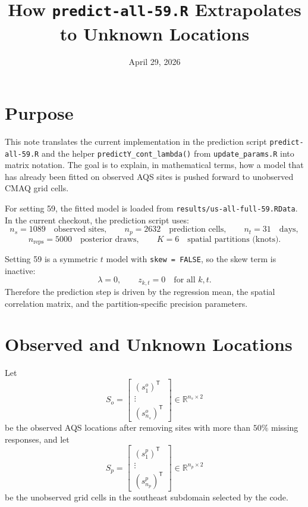 \documentclass[11pt]{article}
\title{How \texttt{predict-all-59.R} Extrapolates to Unknown Locations}
\author{}
\date{April 29, 2026}
\newcommand{\R}{\mathbb{R}}
\newcommand{\trans}{\mathsf{T}}
\begin{document}
\maketitle

\section{Purpose}

This note translates the current implementation in the prediction script
\texttt{predict-all-59.R} and the helper \texttt{predictY\_cont\_lambda()}
from \texttt{update\_params.R} into matrix notation.
The goal is to explain, in mathematical terms, how a model that has already
been fitted on observed AQS sites is pushed forward to unobserved CMAQ grid
cells.

For setting 59, the fitted model is loaded from
\texttt{results/us-all-full-59.RData}. In the current checkout, the prediction
script uses:
\[
n_s = 1089 \quad \text{observed sites}, \qquad
n_p = 2632 \quad \text{prediction cells}, \qquad
n_t = 31 \quad \text{days},
\]
\[
n_{\text{reps}} = 5000 \quad \text{posterior draws}, \qquad
K = 6 \quad \text{spatial partitions (knots)}.
\]

Setting 59 is a symmetric \(t\) model with \texttt{skew = FALSE}, so the skew
term is inactive:
\[
\lambda = 0, \qquad z_{k,t} = 0 \quad \text{for all } k,t.
\]
Therefore the prediction step is driven by the regression mean, the spatial
correlation matrix, and the partition-specific precision parameters.

\section{Observed and Unknown Locations}

Let
\[
S_o =
\begin{bmatrix}
(s^o_1)^\trans \\
\vdots \\
(s^o_{n_s})^\trans
\end{bmatrix}
\in \R^{n_s \times 2}
\]
be the observed AQS locations after removing sites with more than \(50\%\)
missing responses, and let
\[
S_p =
\begin{bmatrix}
(s^p_1)^\trans \\
\vdots \\
(s^p_{n_p})^\trans
\end{bmatrix}
\in \R^{n_p \times 2}
\]
be the unobserved grid cells in the southeast subdomain selected by the code.
\end{document}
